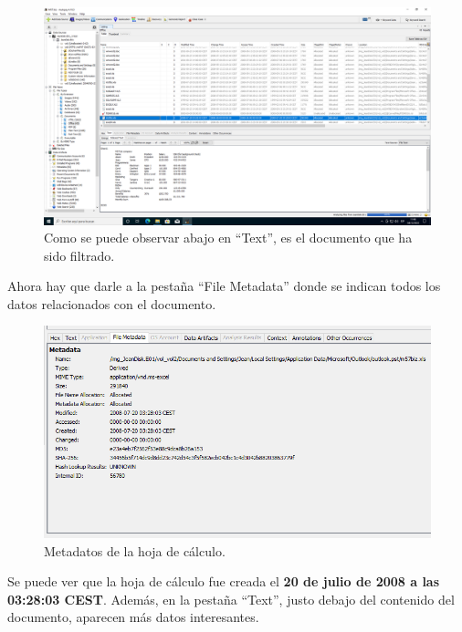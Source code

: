 \documentclass{article}
\begin{document}
\begin{figure}[H]
    \centering
    \includegraphics[width=\textwidth]{imagenes/Windows/Captura de pantalla (5).png}
    \caption{Como se puede observar abajo en ``Text'', es el documento que ha sido filtrado.}
\end{figure}

Ahora hay que darle a la pestaña ``File Metadata'' donde se indican todos los datos relacionados con el documento.

\begin{figure}[H]
    \centering
    \includegraphics[width=\textwidth]{imagenes/Windows/Captura de pantalla (6).png}
    \caption{Metadatos de la hoja de cálculo.}
\end{figure}

Se puede ver que la hoja de cálculo fue creada el \textbf{20 de julio de 2008 a las 03:28:03 CEST}. Además, en la pestaña ``Text'', justo debajo del contenido del documento, aparecen más datos interesantes.
\end{document}
